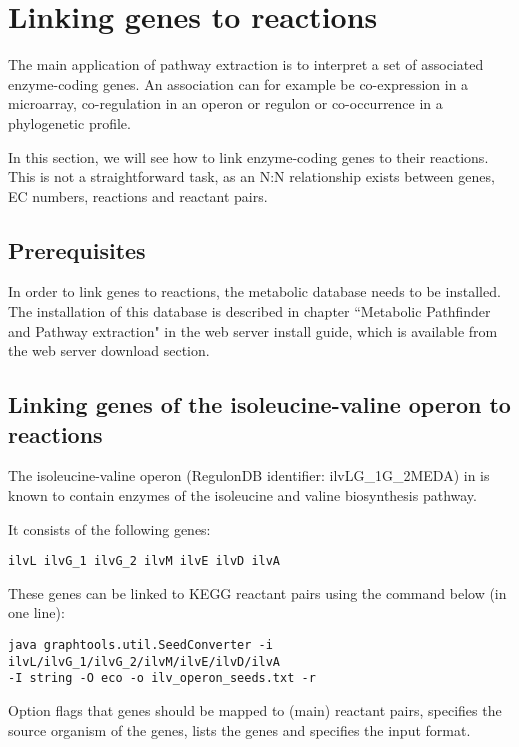 \section{Linking genes to reactions}

The main application of pathway extraction is to interpret a set of
associated enzyme-coding genes. An association can for example be co-expression
in a microarray, co-regulation in an operon or regulon or co-occurrence in a
phylogenetic profile.

In this section, we will see how to link enzyme-coding genes to their reactions.
This is not a straightforward task, as an N:N relationship exists between genes,
EC numbers, reactions and reactant pairs.

\subsection{Prerequisites}\label{metabolicdb}
In order to link genes to reactions, the metabolic database needs to be
installed. The installation of this database is described in chapter
``Metabolic Pathfinder and Pathway extraction" in the \neat web server install
guide, which is available from the \neat web server download section. 

\subsection{Linking genes of the isoleucine-valine operon to
reactions}\label{ilv_operon}

The isoleucine-valine operon (RegulonDB identifier: ilvLG\_1G\_2MEDA) in
 is known to contain enzymes of
the isoleucine and valine biosynthesis pathway. 

It consists of the following genes:

\begin{lstlisting}
ilvL ilvG_1 ilvG_2 ilvM ilvE ilvD ilvA
\end{lstlisting}

These genes can be linked to KEGG reactant pairs using the command below (in one
line):

\begin{lstlisting}
java graphtools.util.SeedConverter -i ilvL/ilvG_1/ilvG_2/ilvM/ilvE/ilvD/ilvA 
-I string -O eco -o ilv_operon_seeds.txt -r
\end{lstlisting}

Option  flags that genes should be mapped to (main) reactant pairs,
 specifies the source organism of the genes,  lists the
genes and  specifies the input format.

